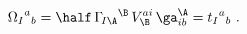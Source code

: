\begin{equation}
  {\Omega_I}^a{}_b = \half\, \Gamma_{\!I\A}{}^\B\, V_\B^{ai}\,
  \ga^\A_{ib} = {t_I}^a{}_b\ .
 \end{equation}

